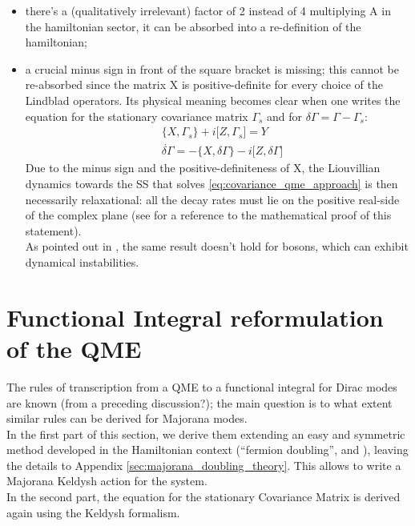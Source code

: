\documentclass[a4paper,11pt]{article}
\theoremstyle{remark}
\newcommand{\np}{\vskip 1.3cm}
\begin{document}
   \begin{itemize} 
   \item there's a (qualitatively irrelevant) factor of 2 instead of 4 multiplying A in the hamiltonian sector, it can be absorbed into a re-definition of the hamiltonian; 
   \item a crucial minus sign in front of the square bracket is missing; this cannot be re-absorbed since the matrix X is positive-definite for every choice of the Lindblad operators. Its physical meaning becomes clear when one writes the equation for the stationary covariance matrix $\Gamma_s$ and for $\delta\Gamma=\Gamma-\Gamma_s$:
   \begin{subequations}
    \begin{align}
     &\big\{ X,\Gamma_s\big\}+i\big[Z,\Gamma_s\big] = Y  \label{eq:covariance_qme_stationary} \\
     &\dot{\delta\Gamma}=-\big\{ X,\delta\Gamma\big\}-i\big[Z,\delta\Gamma\big] \label{eq:covariance_qme_approach}
    \end{align}
   \end{subequations}
   Due to the minus sign and the positive-definiteness of X, the Liouvillian dynamics towards the SS that solves \ref{eq:covariance_qme_approach} is then necessarily relaxational: all the decay rates  must lie on the positive real-side of the complex plane (see \cite{Eisert2010} for a reference to the mathematical proof of this statement).\\ As pointed out in \cite{Eisert2010}, the same result doesn't hold for bosons, which can exhibit dynamical instabilities.\end{itemize}\np


   
 \section{Functional Integral reformulation of the QME}
 The rules of transcription from a QME to a functional integral for Dirac modes are known (from a preceding discussion?); the main question is to what extent similar rules can be derived for Majorana modes.\\ In the first part of this section, we derive them extending an easy and symmetric method developed in the Hamiltonian context (``fermion doubling'', \cite{DeBoer1996} and \cite{Nilsson2013}), leaving the details to Appendix \ref{sec:majorana_doubling_theory}. This allows to write a Majorana Keldysh action for the system. \\In the second part, the equation for the stationary Covariance Matrix is derived again using the Keldysh formalism.\np
\end{document}
